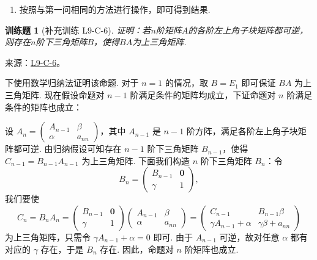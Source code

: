 \documentclass[UTF8,12pt,a4paper,fontset=fandol]{ctexart}
\newtheorem{exercise}{训练题}[section]
\begin{document}
\begin{solve}
\begin{enumerate}
                \item 按照与第一问相同的方法进行操作，即可得到结果.
            \end{enumerate}
\end{solve}

\begin{exercise}[补充训练 L9-C-6]\label{prob:L9-C-6}
证明：若$n$阶矩阵$A$的各阶左上角子块矩阵都可逆，则存在$n$阶下三角矩阵$B$，使得$BA$为上三角矩阵.
\end{exercise}
\noindent 来源：\href{https://github.com/yhwu-is/Linear-Algebra-Left-Undone/blob/new/%E8%AE%B2%E4%B9%89/%E4%B8%93%E9%A2%98/9%20%E7%9F%A9%E9%98%B5%E8%BF%90%E7%AE%97%E8%BF%9B%E9%98%B6.tex}{L9-C-6}。
\begin{solve}
下使用数学归纳法证明该命题. 对于 $n=1$ 的情况，取 $B=E_1$ 即可保证 $BA$ 为上三角矩阵. 现在假设命题对 $n-1$ 阶满足条件的矩阵均成立，下证命题对 $n$ 阶满足条件的矩阵也成立：

            设 $A_n = \begin{pmatrix}
                A_{n-1} & \beta \\
                \alpha  & a_{nn}
            \end{pmatrix}$，其中 $A_{n-1}$ 是 $n-1$ 阶方阵，满足各阶左上角子块矩阵都可逆. 由归纳假设可知存在 $n-1$ 阶下三角矩阵 $B_{n-1}$，使得 $C_{n-1} = B_{n-1}A_{n-1}$ 为上三角矩阵. 下面我们构造 $n$ 阶下三角矩阵 $B_n$：令
            \[
                B_n = \begin{pmatrix}
                    B_{n-1} & \mathbf{0} \\
                    \gamma  & 1
                \end{pmatrix},
            \]
            我们要使
            \[
                C_n = B_n A_n = \begin{pmatrix}
                    B_{n-1} & \mathbf{0} \\
                    \gamma  & 1
                \end{pmatrix} \begin{pmatrix}
                    A_{n-1} & \beta \\
                    \alpha  & a_{nn}
                \end{pmatrix} = \begin{pmatrix}
                    C_{n-1}                 & B_{n-1} \beta         \\
                    \gamma A_{n-1} + \alpha & \gamma \beta + a_{nn}
                \end{pmatrix}
            \]
            为上三角矩阵，只需令 $\gamma A_{n-1} + \alpha = 0$ 即可. 由于 $A_{n-1}$ 可逆，故对任意 $\alpha$ 都有对应的 $\gamma$ 存在，于是 $B_n$ 存在. 因此，命题对 $n$ 阶矩阵也成立.
\end{solve}
\end{document}
